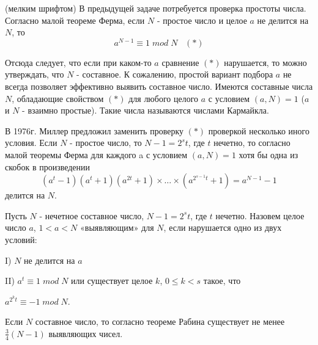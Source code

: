 \begin{remark} (мелким шрифтом)
В предыдущей задаче потребуется проверка простоты числа. 
Согласно малой теореме Ферма, если $N$ - простое число и целое $a$ не делится на $N$, то  
\[a^{N-1} \equiv 1\; mod\; N                         \; \; \;            \left(*\right)\] 

Отсюда следует, что если при каком-то $a$ сравнение $\left(*\right)$ нарушается, то можно утверждать, что $N$ - составное. 
К сожалению,  простой вариант подбора $a$ не всегда позволяет эффективно выявить составное число. Имеются составные числа $N$, обладающие свойством $\left(*\right)$ для любого целого $a$ с условием $\left(a,N\right)=1$ ($a$ и $N$ - взаимно простые). Такие числа называются числами Кармайкла.

В 1976г. Миллер предложил заменить проверку $\left(*\right)$ проверкой несколько иного условия. Если $N$ - простое число, то $N-1=2^{s} t$, где $t$ нечетно, то согласно малой теоремы Ферма для каждого a с условием $\left(a,N\right)=1$ хотя бы одна из скобок в произведении 
\[\left(a^{t} -1\right)\left(a^{t} +1\right)\left(a^{2t} +1\right)\times \ldots \times \left(a^{2^{s-1} t} +1\right)=a^{N-1} -1\] 
делится на $N$. 

Пусть $N$ - нечетное составное число, $N-1=2^{s} t$, где \textbf{$t$ }нечетно. Назовем целое число $a$, $1<a<N$ «выявляющим» для $N$, если нарушается одно из двух условий:

I) $N$ не делится на $a$

II) $a^{t} \equiv 1\; mod\; N$ или существует целое $k$, $0\le k<s$ такое, что 

$a^{2^{k} t} \equiv -1\; mod\; N$.

Если $N$ составное число, то согласно теореме Рабина  существует не менее $\frac{3}{4} \left(N-1\right)$  выявляющих чисел.

\end{remark}

